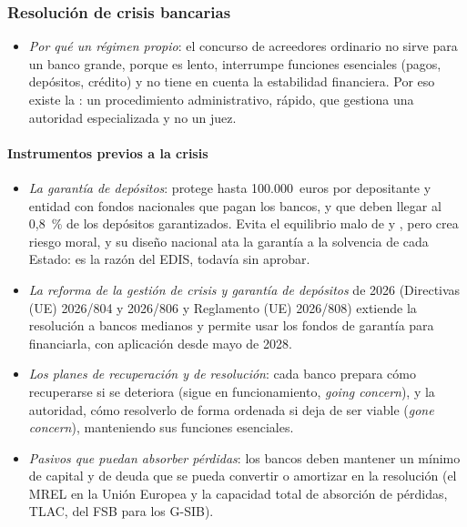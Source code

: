 \documentclass[11pt]{article}
\begin{document}
\subsubsection{Resolución de crisis bancarias}\label{sec:resolucion}

\begin{itemize}
\item \emph{Por qué un régimen propio}: el concurso de acreedores ordinario no sirve para un banco grande, porque es lento, interrumpe funciones esenciales (pagos, depósitos, crédito) y no tiene en cuenta la estabilidad financiera. Por eso existe la : un procedimiento administrativo, rápido, que gestiona una autoridad especializada y no un juez\nocite{DirUE2014BRRD}.
\end{itemize}

\paragraph{Instrumentos previos a la crisis}

\begin{itemize}
\item \emph{La garantía de depósitos}: protege hasta 100.000~euros por depositante y entidad con fondos nacionales que pagan los bancos, y que deben llegar al 0,8~\% de los depósitos garantizados\nocite{UE2014DGSD,FGD2026Garantia}. Evita el equilibrio malo de  y , pero crea riesgo moral, y su diseño nacional ata la garantía a la solvencia de cada Estado: es la razón del EDIS, todavía sin aprobar\nocite{PE2026EDIS}.
\item \emph{La reforma de la gestión de crisis y garantía de depósitos} de 2026 (Directivas (UE) 2026/804 y 2026/806 y Reglamento (UE) 2026/808) extiende la resolución a bancos medianos y permite usar los fondos de garantía para financiarla, con aplicación desde mayo de 2028\nocite{UE2026Dir804,SRB2026CMDI}.
\item \emph{Los planes de recuperación y de resolución}: cada banco prepara cómo recuperarse si se deteriora (sigue en funcionamiento, \emph{going concern}), y la autoridad, cómo resolverlo de forma ordenada si deja de ser viable (\emph{gone concern}), manteniendo sus funciones esenciales.
\item \emph{Pasivos que puedan absorber pérdidas}: los bancos deben mantener un mínimo de capital y de deuda que se pueda convertir o amortizar en la resolución (el MREL en la Unión Europea y la capacidad total de absorción de pérdidas, TLAC, del FSB para los G-SIB).
\end{itemize}
\end{document}
